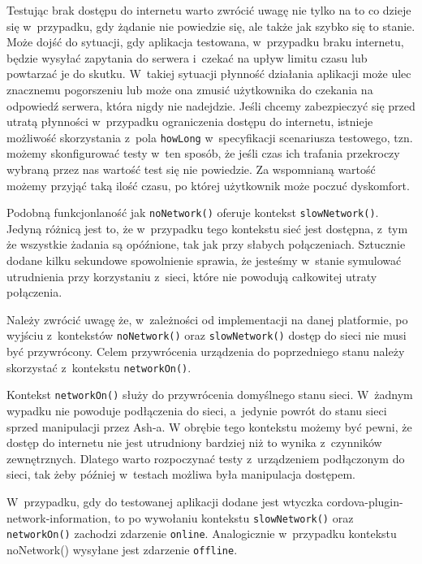 \documentclass[brudnopis]{xmgr}
\begin{document}
Testując brak dostępu do internetu warto zwrócić uwagę nie tylko na to co dzieje się w~przypadku, gdy żądanie nie powiedzie się, ale także jak szybko się to stanie. Może dojść do sytuacji, gdy aplikacja testowana, w~przypadku braku internetu, będzie wysyłać zapytania do serwera i~czekać na upływ limitu czasu lub powtarzać je do skutku. W~takiej sytuacji płynność działania aplikacji może ulec znacznemu pogorszeniu lub może ona zmusić użytkownika do czekania na odpowiedź serwera, która nigdy nie nadejdzie. Jeśli chcemy zabezpieczyć się przed utratą płynności w~przypadku ograniczenia dostępu do internetu, istnieje możliwość skorzystania z~pola \texttt{howLong} w~specyfikacji scenariusza testowego, tzn. możemy skonfigurować testy w~ten sposób, że jeśli czas ich trafania przekroczy wybraną przez nas wartość test się nie powiedzie. Za wspomnianą wartość możemy przyjąć taką ilość czasu, po której użytkownik może poczuć dyskomfort. 

Podobną funkcjonlaność jak \texttt{noNetwork()} oferuje kontekst \texttt{slowNetwork()}. Jedyną różnicą jest to, że w~przypadku tego kontekstu sieć jest dostępna, z~tym że wszystkie żadania są opóźnione, tak jak przy słabych połączeniach. Sztucznie dodane kilku sekundowe spowolnienie sprawia, że jesteśmy w~stanie symulować utrudnienia przy korzystaniu z~sieci, które nie powodują całkowitej utraty połączenia. 

Należy zwrócić uwagę że, w~zależności od implementacji na danej platformie, po wyjściu z~kontekstów \texttt{noNetwork()} oraz \texttt{slowNetwork()} dostęp do sieci nie musi być przywrócony. Celem przywrócenia urządzenia do poprzedniego stanu należy skorzystać z~kontekstu \texttt{networkOn()}. 

Kontekst \texttt{networkOn()} służy do przywrócenia domyślnego stanu sieci. W~żadnym wypadku nie powoduje podłączenia do sieci, a~jedynie powrót do stanu sieci sprzed manipulacji przez Ash-a. W obrębie tego kontekstu możemy być pewni, że dostęp do internetu nie jest utrudniony bardziej niż to wynika z~czynników zewnętrznych. Dlatego warto rozpoczynać testy z~urządzeniem podłączonym do sieci, tak żeby później w~testach możliwa była manipulacja dostępem.

W~przypadku, gdy do testowanej aplikacji dodane jest wtyczka cordova-plugin-network-information,  to po wywołaniu kontekstu \texttt{slowNetwork()} oraz \texttt{networkOn()} zachodzi zdarzenie \texttt{online}. Analogicznie w~przypadku kontekstu noNetwork() wysyłane jest zdarzenie \texttt{offline}. 
\end{document}
